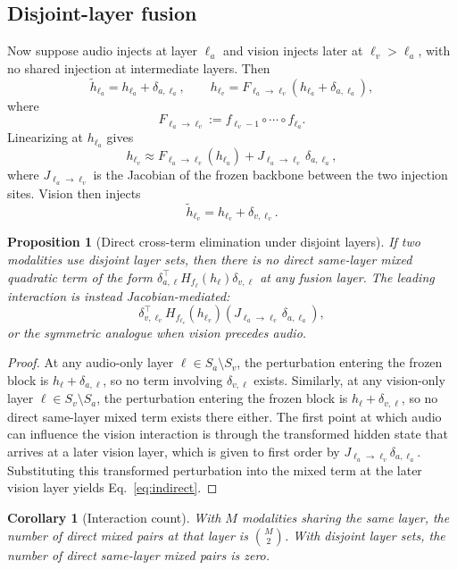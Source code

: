 \documentclass[11pt]{article}
\newtheorem{proposition}{Proposition}
\newtheorem{corollary}{Corollary}
\begin{document}
\subsection{Disjoint-layer fusion}

Now suppose audio injects at layer $\ell_a$ and vision injects later at
$\ell_v > \ell_a$, with no shared injection at intermediate layers. Then
\[
\tilde h_{\ell_a} = h_{\ell_a} + \delta_{a,\ell_a},
\qquad
h_{\ell_v}
=
F_{\ell_a \to \ell_v}\!\left(h_{\ell_a} + \delta_{a,\ell_a}\right),
\]
where
\[
F_{\ell_a \to \ell_v}
:=
f_{\ell_v-1}\circ \cdots \circ f_{\ell_a}.
\]
Linearizing at $h_{\ell_a}$ gives
\[
h_{\ell_v}
\approx
F_{\ell_a \to \ell_v}(h_{\ell_a})
+ J_{\ell_a \to \ell_v}\,\delta_{a,\ell_a},
\]
where $J_{\ell_a \to \ell_v}$ is the Jacobian of the frozen backbone between
the two injection sites. Vision then injects
\[
\tilde h_{\ell_v}
=
h_{\ell_v} + \delta_{v,\ell_v}.
\]

\begin{proposition}[Direct cross-term elimination under disjoint layers]
\label{prop:disjoint}
If two modalities use disjoint layer sets, then there is no direct same-layer
mixed quadratic term of the form
$\delta_{a,\ell}^\top H_{f_\ell}(h_\ell)\delta_{v,\ell}$ at any fusion layer.
The leading interaction is instead Jacobian-mediated:
\begin{equation}
\delta_{v,\ell_v}^\top
H_{f_{\ell_v}}(h_{\ell_v})
\left(J_{\ell_a \to \ell_v}\,\delta_{a,\ell_a}\right),
\label{eq:indirect}
\end{equation}
or the symmetric analogue when vision precedes audio.
\end{proposition}

\begin{proof}
At any audio-only layer $\ell \in S_a \setminus S_v$, the perturbation entering
the frozen block is $h_\ell + \delta_{a,\ell}$, so no term involving
$\delta_{v,\ell}$ exists. Similarly, at any vision-only layer
$\ell \in S_v \setminus S_a$, the perturbation entering the frozen block is
$h_\ell + \delta_{v,\ell}$, so no direct same-layer mixed term exists there
either. The first point at which audio can influence the vision interaction is
through the transformed hidden state that arrives at a later vision layer,
which is given to first order by $J_{\ell_a \to \ell_v}\delta_{a,\ell_a}$.
Substituting this transformed perturbation into the mixed term at the later
vision layer yields Eq.~\eqref{eq:indirect}.
\end{proof}

\begin{corollary}[Interaction count]
With $M$ modalities sharing the same layer, the number of direct mixed pairs at
that layer is $\binom{M}{2}$. With disjoint layer sets, the number of direct
same-layer mixed pairs is zero.
\end{corollary}
\end{document}

